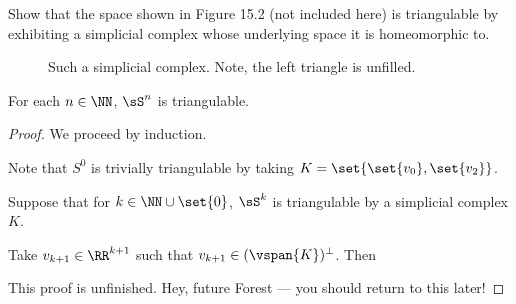 \begin{problem}[15.15]
  Show that the space shown in Figure 15.2 (not included here) is triangulable
  by exhibiting a simplicial complex whose underlying space it is homeomorphic
  to.
\end{problem}
\begin{solution}
  \begin{figure}[H]
    \centering
    \caption{Such a simplicial complex. Note, the left triangle is unfilled.}
  \end{figure}
\end{solution}
\begin{problem}[15.6]
  For each $n \in \NN$, $\sS^n$ is triangulable.
\end{problem}
\begin{proof}
  We proceed by induction.

  \begin{induction}
    \item Note that $S^0$ is trivially triangulable by taking $K =
      \set{\set{v_0}, \set{v_2}}$.
    \item Suppose that for $k \in \NN \cup \set{0}$, $\sS^k$ is triangulable by
      a simplicial complex $K$.
    \item Take $v_{k+1} \in \RR^{k+1}$ such that $v_{k+1} \in
      (\vspan{K})^\perp$. Then
  \end{induction}
  {\color{red} This proof is unfinished. Hey, future Forest --- you should
    return to this later!}
\end{proof}
